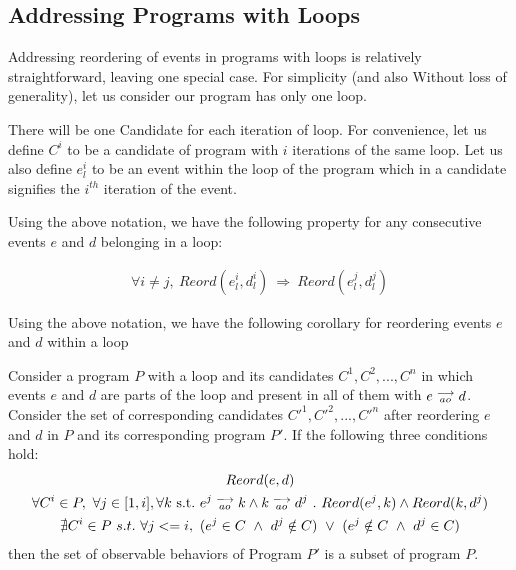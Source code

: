 \subsection{Addressing Programs with Loops}
        
        Addressing reordering of events in programs with loops is relatively straightforward, leaving one special case. 
        For simplicity (and also Without loss of generality), let us consider our program has only one loop.

        There will be one Candidate for each iteration of loop. For convenience, let us define $C^i$ to be a candidate of program with $i$ iterations of the same loop. Let us also define $e_l^i$ to be an event within the loop of the program which in a candidate signifies the $i^{th}$ iteration of the event. 

        Using the above notation, we have the following property for any consecutive events $e$ and $d$ belonging in a loop:
        \begin{property}
            \label{LoopReordEq}
            \begin{align*}
                \forall i \neq j, \ Reord(e_l^i, d_l^i) \ \Rightarrow \ Reord(e_l^j, d_l^j)
            \end{align*}
        \end{property}
        
        Using the above notation, we have the following corollary for reordering events $e$ and $d$ within a loop 
        
        \begin{corollary}
            Consider a program $P$ with a loop and its candidates $C^1, C^2, ... , C^n$ in which events $e$ and $d$ are parts of the loop and present in all of them with $e\stackrel{\longrightarrow}{_{ao}}d$. Consider the set of corresponding candidates $C'^1, C'^2, ... , C'^n$ after reordering $e$ and $d$ in $P$ and its corresponding program $P'$. If the following three conditions hold:
            \begin{gather*}
                Reord(e, d) \\ 
                \forall C^i \in P , \ \forall j \in [1,i], \forall k \ \text{s.t.} \ \reln{e^j}{ao}{k} \wedge \reln{k}{ao}{d^j} \ . \ Reord(e^j, k) \wedge Reord(k, d^j)  \\ 
                \nexists C^i \in P \ s.t. \ 
                    \forall j <= i , \ (e^j \in C \ \wedge \ d^j \notin C) \ \vee \ 
                    (e^j \notin C \ \wedge \ d^j \in C) 
            \end{gather*}
            then the set of observable behaviors of Program $P'$ is a subset of program $P$.     
        \end{corollary}

